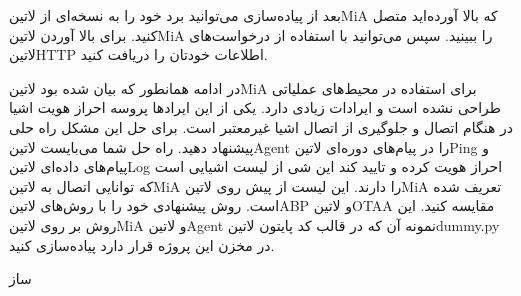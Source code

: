 \documentclass[]{assignment}
\begin{document}
بعد از پیاده‌سازی می‌توانید برد خود را به نسخه‌ای از ‌لاتین{MiA} که بالا آورده‌اید متصل کنید.
برای بالا آوردن ‌لاتین{MiA}  را ببینید.
سپس می‌توانید با استفاده از درخواست‌های ‌لاتین{HTTP} اطلاعات خودتان را دریافت کنید.

در ادامه همانطور که بیان شده بود ‌لاتین{MiA} برای استفاده در محیط‌های عملیاتی طراحی نشده است و ایرادات زیادی دارد. یکی از این ایرادها پروسه احراز هویت اشیا
در هنگام اتصال و جلوگیری از اتصال اشیا غیرمعتبر است. برای حل این مشکل راه حلی پیشنهاد دهید. راه حل شما می‌بایست ‌لاتین{Agent} را در پیام‌های دوره‌ای
‌لاتین{Ping} و پیام‌های داده‌ای ‌لاتین{Log} احراز هویت کرده و تایید کند این شی از لیست اشیایی است که توانایی اتصال به ‌لاتین{MiA}
را دارند. این لیست از پیش روی ‌لاتین{MiA} تعریف شده است. روش پیشنهادی خود را با روش‌های ‌لاتین{ABP} و ‌لاتین{OTAA} مقایسه کنید.
این روش بر روی ‌لاتین{MiA} و ‌لاتین{Agent} نمونه آن که در قالب کد پایتون ‌لاتین{dummy.py} در مخزن این پروژه قرار دارد پیاده‌سازی کنید.

‌ساز
\end{document}
